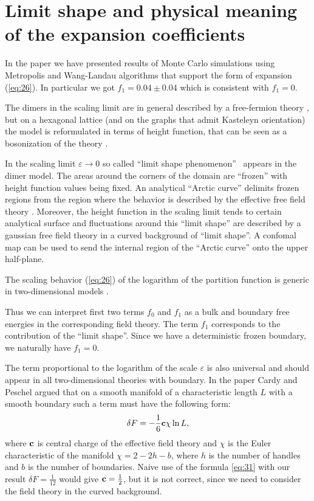 \documentclass{article}
\begin{document}
\section{Limit shape and physical meaning of the expansion coefficients}
\label{sec:accur-expans-phys}

In the paper \cite{1742-6596-1135-1-012024} we have presented results of Monte Carlo simulations using
Metropolis and Wang-Landau algorithms that support the form of expansion (\ref{eq:26}). In
particular we got $f_{1}=0.04\pm 0.04$ which is consistent with $f_{1}=0$. 

The dimers in the scaling limit are in general described by a
free-fermion theory \cite{dijkgraaf2009dimer}, but on a hexagonal
lattice (and on the graphs that admit Kasteleyn orientation) the model
is reformulated in terms of height function, that can be seen as a
bosonization of the theory \cite{gogolin2004bosonization}.

In the scaling limit $\varepsilon\to 0$ so called ``limit shape
phenomenon''~\cite{1998math......1068J,cohn1998shape} appears in the
dimer model. The areas around the corners of the domain are ``frozen''
with height function values being fixed. An analytical ``Arctic
curve'' delimits frozen regions from the region where the behavior is
described by the effective free field theory
\cite{kenyon2009lectures,kenyon2008height,kenyon2006dimers}. Moreover,
the height function in the scaling limit tends to certain analytical
surface and fluctuations around this ``limit shape'' are described by
a gaussian free field theory in a curved background of ``limit
shape''. A confomal map can be used to send the internal region of the
``Arctic curve'' onto the upper half-plane.

The scaling behavior (\ref{eq:26}) of the logarithm of the partition function is generic in two-dimensional
models \cite{cardy1988finite}.

Thus we can interpret first two terms $f_{0}$ and $f_{1}$ as a bulk
and boundary free energies in the corresponding field theory. The term
$f_1$ corresponds to the contribution of the ``limit shape''. Since we
have a deterministic frozen boundary, we naturally have $f_{1}=0$.

The term proportional to the logarithm of the scale $\varepsilon$ is also universal
\cite{cardy1988finite} and should appear in all two-dimensional theories with boundary. In the paper
\cite{cardy1988finite} Cardy and Peschel argued that on a smooth manifold of a characteristic length $L$ with a smooth
boundary such a term must have the following form:
\begin{equation}
  \label{eq:31}
  \delta F = -\frac{1}{6}{\bf c} \chi \ln L,
\end{equation}
where ${\bf c}$ is central charge of the effective field theory and
$\chi$ is the Euler characteristic of the manifold $\chi=2-2 h-b$,
where $h$ is the number of handles and $b$ is the number of
boundaries. Naive use of the formula \eqref{eq:31} with our result
$\delta F=\frac{1}{12}$ would give ${\bf c}=\frac{1}{2}$, but it is
not correct, since we need to consider the field theory in the curved
background.
\end{document}
